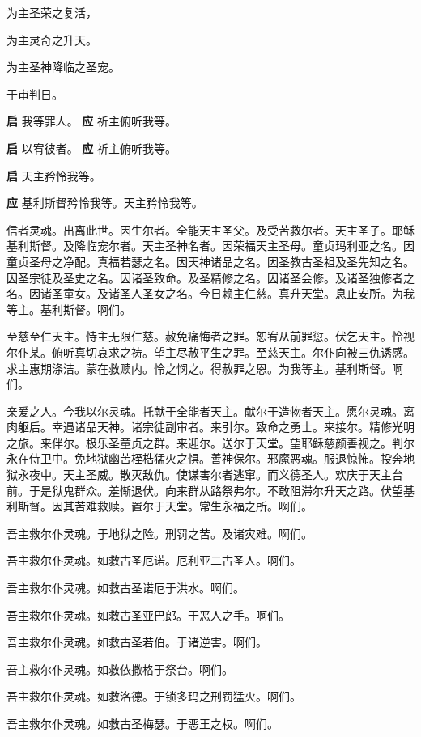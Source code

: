 \documentclass[UTF8,17pt]{ctexart}
\begin{document}
 为主圣荣之复活，

 为主灵奇之升天。

 为主圣神降临之圣宠。

 于审判⽇。

\textbf{启} \quad 我等罪⼈。 \hfill \textbf{应} \quad 祈主俯听我等。

\textbf{启} \quad 以宥彼者。 \hfill \textbf{应} \quad 祈主俯听我等。

\textbf{启} \quad 天主矜怜我等。

\textbf{应} \quad 基利斯督矜怜我等。天主矜怜我等。

信者灵魂。出离此世。因⽣尔者。全能天主圣⽗。及受苦救尔者。天主圣⼦。耶稣基利斯督。及降临宠尔者。天主圣神名者。因荣福天主圣母。童贞玛利亚之名。因童贞圣母之净配。真福若瑟之名。因天神诸品之名。因圣教古圣祖及圣先知之名。因圣宗徒及圣史之名。因诸圣致命。及圣精修之名。因诸圣会修。及诸圣独修者之名。因诸圣童⼥。及诸圣⼈圣⼥之名。今⽇赖主仁慈。真升天堂。息⽌安所。为我等主。基利斯督。啊们。

⾄慈⾄仁天主。恃主⽆限仁慈。赦免痛悔者之罪。恕宥从前罪愆。伏乞天主。怜视尔仆某。俯听真切哀求之祷。望主尽赦平⽣之罪。⾄慈天主。尔仆向被三仇诱感。求主惠期涤洁。蒙在救赎内。怜之悯之。得赦罪之恩。为我等主。基利斯督。啊们。

亲爱之⼈。今我以尔灵魂。托献于全能者天主。献尔于造物者天主。愿尔灵魂。离⾁躯后。幸遇诸品天神。诸宗徒副审者。来引尔。致命之勇⼠。来接尔。精修光明之旅。来伴尔。极乐圣童贞之群。来迎尔。送尔于天堂。望耶稣慈颜善视之。判尔永在侍卫中。免地狱幽苦桎梏猛⽕之惧。善神保尔。邪魔恶魂。服退惊怖。投奔地狱永夜中。天主圣威。散灭敌仇。使谋害尔者逃窜。⽽义德圣⼈。欢庆于天主台前。于是狱⿁群众。羞惭退伏。向来群从路祭弗尔。不敢阻滞尔升天之路。伏望基利斯督。因其苦难救赎。置尔于天堂。常⽣永福之所。啊们。

吾主救尔仆灵魂。于地狱之险。刑罚之苦。及诸灾难。啊们。

吾主救尔仆灵魂。如救古圣厄诺。厄利亚⼆古圣⼈。啊们。

吾主救尔仆灵魂。如救古圣诺厄于洪⽔。啊们。

吾主救尔仆灵魂。如救古圣亚巴郎。于恶⼈之⼿。啊们。

吾主救尔仆灵魂。如救古圣若伯。于诸逆害。啊们。

吾主救尔仆灵魂。如救依撒格于祭台。啊们。

吾主救尔仆灵魂。如救洛德。于锁多玛之刑罚猛⽕。啊们。

吾主救尔仆灵魂。如救古圣梅瑟。于恶王之权。啊们。
\end{document}
